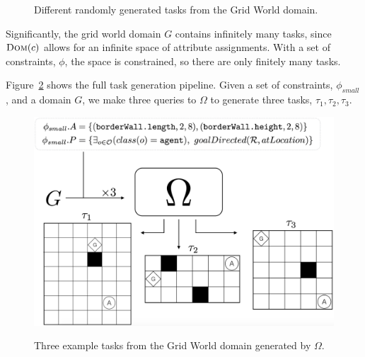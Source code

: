 \documentclass[11pt]{article}
\begin{document}
\begin{figure}
\centering
{}\hspace{10mm}
  \caption{Different randomly generated tasks from the Grid World domain.}
  \label{fig:grid_examples}
\end{figure}

Significantly, the grid world domain $G$ contains infinitely many tasks, since $\textsc{Dom}(c)$ allows for an infinite space of attribute assignments. With a set of constraints, $\phi$, the space is constrained, so there are only finitely many tasks.

Figure~\ref{fig:task_generator} shows the full task generation pipeline. Given a set of constraints, $\phi_{small}$, and a domain $G$, we make three queries to $\Omega$ to generate three tasks, $\tau_1, \tau_2, \tau_3$.

\begin{figure}
\centering
\includegraphics[width=0.7\linewidth]{figures/task_generator.png}
\label{fig:task_generator}
\caption{Three example tasks from the Grid World domain generated by $\Omega$.}
\end{figure}
\end{document}
